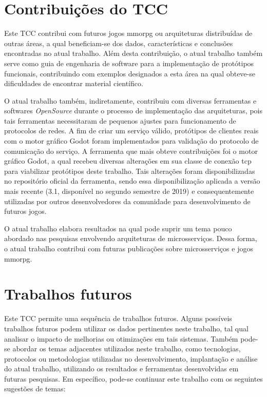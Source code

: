 \section{Contribuições do TCC}

Este TCC contribui com futuros jogos \ac{mmorpg} ou arquiteturas distribuídas de outras áreas, a qual beneficiam-se dos dados, características e conclusões encontradas no atual trabalho.
%
Além desta contribuição, o atual trabalho também serve como guia de engenharia de software para a implementação de protótipos funcionais, contribuindo com exemplos designados a esta área na qual obteve-se dificuldades de encontrar material científico.

O atual trabalho também, indiretamente, contribuiu com diversas ferramentas e softwares \textit{OpenSource} durante o processo de implementação das arquiteturas, pois tais ferramentas necessitaram de pequenos ajustes para funcionamento de protocolos de redes.
%
A fim de criar um serviço válido, protótipos de clientes reais com o motor gráfico Godot foram implementados para validação do protocolo de comunicação do serviço.
%
A ferramenta que mais obteve contribuições foi o motor gráfico Godot, a qual recebeu diversas alterações em sua classe de conexão \ac{tcp} para viabilizar protótipos deste trabalho.
%
Tais alterações foram disponibilizadas no repositório oficial da ferramenta, sendo essa disponibilização aplicada a versão mais recente (3.1, disponível no segundo semestre de 2019) e consequentemente utilizadas por outros desenvolvedores da comunidade para desenvolvimento de futuros jogos.


O atual trabalho elabora resultados na qual pode suprir um tema pouco abordado nas pesquisas envolvendo arquiteturas de microsserviços.
%
Dessa forma, o atual trabalho contribui com futuras publicações sobre microsserviços e jogos \ac{mmorpg}.

\section{Trabalhos futuros}

Este TCC permite uma sequência de trabalhos futuros.
%
Alguns possíveis trabalhos futuros podem utilizar os dados pertinentes neste trabalho, tal qual analisar o impacto de melhorias ou otimizações em tais sistemas.
%
Também pode-se abordar os temas adjacentes utilizados neste trabalho, como tecnologias, protocolos ou metodologias utilizadas no desenvolvimento, implantação e análise do atual trabalho, utilizando os resultados e ferramentas desenvolvidas em futuras pesquisas.
%
Em específico, pode-se continuar este trabalho com os seguintes sugestões de temas:

